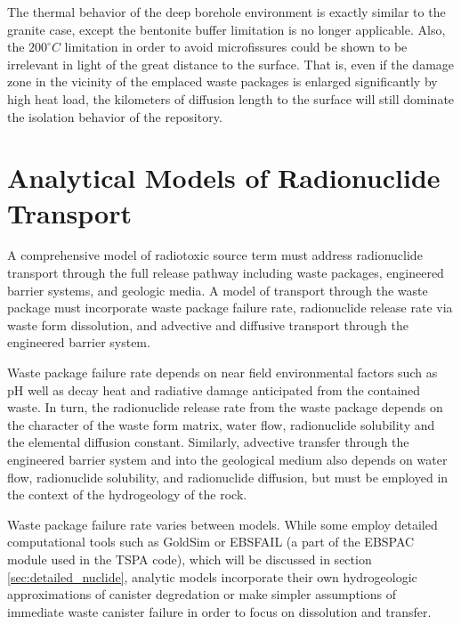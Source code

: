 The thermal behavior of the deep borehole environment is exactly similar to the 
granite case, except the bentonite buffer limitation is no longer applicable. 
Also, the $200^{\circ}C$ limitation in order to avoid microfissures could  
be shown to be irrelevant in light of the great distance to the surface. That 
is, even if the damage zone in the vicinity of the emplaced waste packages is 
enlarged significantly by high heat load, the kilometers of diffusion length to 
the surface will still dominate the isolation behavior of the repository. 




\section{Analytical Models of Radionuclide Transport} \label{sec:analytical_nuc}






A comprehensive model of radiotoxic source term must address radionuclide transport
through the full release pathway including waste packages, engineered barrier
systems, and geologic media. A model of transport through the waste package
must incorporate waste package failure rate, radionuclide release rate via waste
form dissolution, and advective and diffusive transport through the 
engineered barrier system.  

Waste package failure rate depends on near field environmental factors such as
pH well as decay heat and radiative damage anticipated from the
contained waste.  In turn, the radionuclide release rate from the waste package
depends on the character of the waste form matrix, water flow,
radionuclide solubility and the elemental diffusion constant.  Similarly, advective
transfer through the engineered barrier system and into the geological medium
also depends on water flow, radionuclide solubility, and radionuclide diffusion, but must
be employed in the context of the hydrogeology of the rock.   

Waste package failure rate varies between models. While some employ detailed 
computational tools such as GoldSim or EBSFAIL (a part of the EBSPAC module 
used in the TSPA code), which will be discussed in section 
\ref{sec:detailed_nuclide}, 
analytic models incorporate their own hydrogeologic approximations of
canister degredation or make simpler assumptions of immediate waste canister 
failure in order to focus on dissolution and transfer. 

